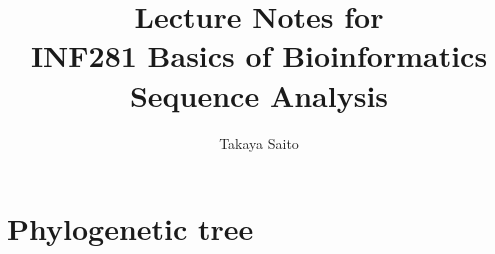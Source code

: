 \documentclass[12pt]{article}
\title{Lecture Notes for \\ INF281 Basics of Bioinformatics Sequence Analysis}
\author{Takaya Saito}
\date{}
\begin{document}
\setcounter{page}{63}

\makeatletter 
\renewcommand{\thefigure}{\arabic{section}.\arabic{figure}}
\renewcommand{\thetable}{\arabic{section}.\arabic{table}}
\makeatother

%
%
\setcounter{section}{8}
\setcounter{figure}{0}
\setcounter{table}{0}
\section{Phylogenetic tree}




\end{document}
